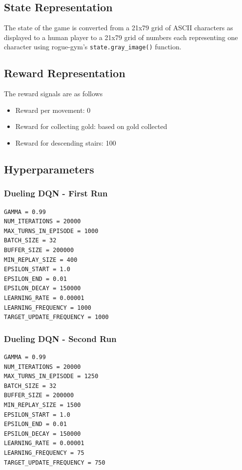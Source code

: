 \documentclass[12pt,a4paper]{article}
\begin{document}
    \subsection{State Representation}\label{subsec:state-representation}
    The state of the game is converted from a 21x79 grid of ASCII characters as displayed to a human player to a 21x79 grid of
    numbers each representing one character using rogue-gym's \texttt{state.gray\_image()} function.

    \subsection{Reward Representation}\label{subsec:reward-representation}
    The reward signals are as follows
    \begin{itemize}
        \item Reward per movement: 0
        \item Reward for collecting gold: based on gold collected
        \item Reward for descending stairs: 100
    \end{itemize}

    \subsection{Hyperparameters}\label{subsec:hyperparameters}
    \subsubsection{Dueling DQN - First Run}
    \begin{lstlisting}[label={lst:ddqn1hyperparameters}]
GAMMA = 0.99
NUM_ITERATIONS = 20000
MAX_TURNS_IN_EPISODE = 1000
BATCH_SIZE = 32
BUFFER_SIZE = 200000
MIN_REPLAY_SIZE = 400
EPSILON_START = 1.0
EPSILON_END = 0.01
EPSILON_DECAY = 150000
LEARNING_RATE = 0.00001
LEARNING_FREQUENCY = 1000
TARGET_UPDATE_FREQUENCY = 1000
    \end{lstlisting}

    \subsubsection{Dueling DQN - Second Run}
    \begin{lstlisting}[label={lst:ddqn2hyperparameters}]
GAMMA = 0.99
NUM_ITERATIONS = 20000
MAX_TURNS_IN_EPISODE = 1250
BATCH_SIZE = 32
BUFFER_SIZE = 200000
MIN_REPLAY_SIZE = 1500
EPSILON_START = 1.0
EPSILON_END = 0.01
EPSILON_DECAY = 150000
LEARNING_RATE = 0.00001
LEARNING_FREQUENCY = 75
TARGET_UPDATE_FREQUENCY = 750
    \end{lstlisting}
\end{document}
